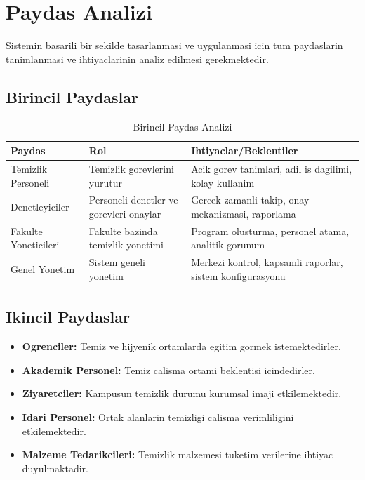 \section{Paydas Analizi}
\label{sec:paydas-analizi}

Sistemin basarili bir sekilde tasarlanmasi ve uygulanmasi icin 
tum paydaslarin tanimlanmasi ve ihtiyaclarinin analiz edilmesi 
gerekmektedir.

\subsection{Birincil Paydaslar}
\label{subsec:birincil-paydaslar}

\begin{table}[H]
\centering
\caption{Birincil Paydas Analizi}
\label{tab:birincil-paydaslar}
\begin{tabular}{|p{2.5cm}|p{4cm}|p{5cm}|}
\hline
\textbf{Paydas} & \textbf{Rol} & \textbf{Ihtiyaclar/Beklentiler} \\
\hline
Temizlik Personeli & Temizlik gorevlerini yurutur & Acik gorev tanimlari, 
adil is dagilimi, kolay kullanim \\
\hline
Denetleyiciler & Personeli denetler ve gorevleri onaylar & 
Gercek zamanli takip, onay mekanizmasi, raporlama \\
\hline
Fakulte Yoneticileri & Fakulte bazinda temizlik yonetimi & Program 
olusturma, personel atama, analitik gorunum \\
\hline
Genel Yonetim & Sistem geneli yonetim & Merkezi kontrol, 
kapsamli raporlar, sistem konfigurasyonu \\
\hline
\end{tabular}
\end{table}

\subsection{Ikincil Paydaslar}
\label{subsec:ikincil-paydaslar}

\begin{itemize}
    \item \textbf{Ogrenciler:} Temiz ve hijyenik ortamlarda 
    egitim gormek istemektedirler.
    
    \item \textbf{Akademik Personel:} Temiz calisma ortami 
    beklentisi icindedirler.
    
    \item \textbf{Ziyaretciler:} Kampusun temizlik durumu 
    kurumsal imaji etkilemektedir.
    
    \item \textbf{Idari Personel:} Ortak alanlarin temizligi 
    calisma verimliligini etkilemektedir.
    
    \item \textbf{Malzeme Tedarikcileri:} Temizlik malzemesi 
    tuketim verilerine ihtiyac duyulmaktadir.
\end{itemize}

